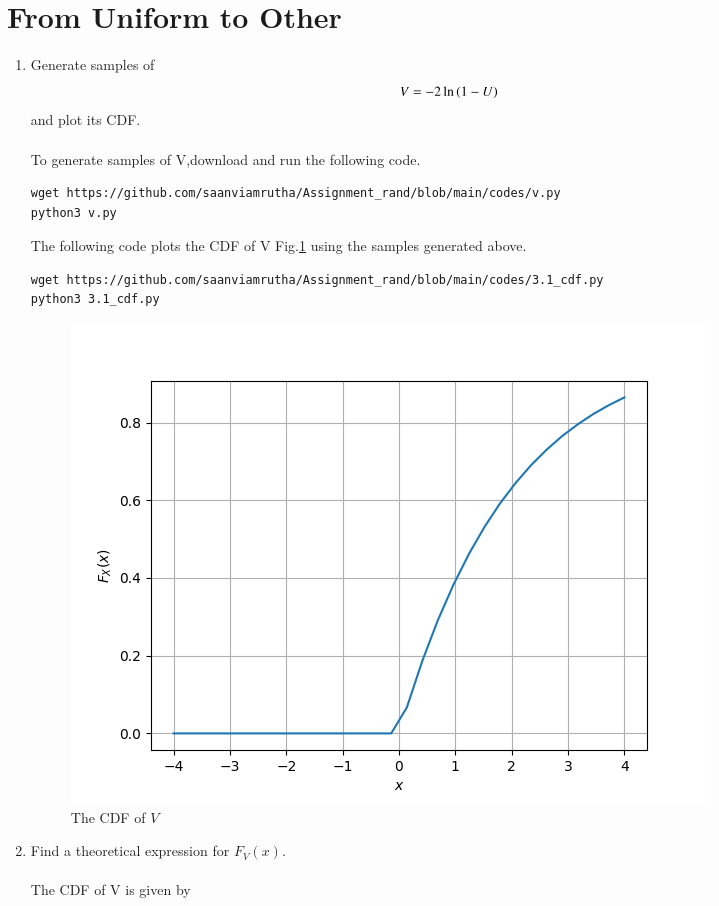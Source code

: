 \documentclass[journal,12pt,twocolumn]{IEEEtran}
\renewcommand\thesection{\arabic{section}}
\begin{document}
\section{From Uniform to Other}
\begin{enumerate}[label=\thesection.\arabic*
,ref=\thesection.\theenumi]
%
\item
Generate samples of 
%
\begin{equation}
V = -2\ln\left(1-U\right)
\end{equation}
%
and plot its CDF. \\
\solution \\
To generate samples of V,download and run the following code.
\begin{lstlisting}
wget https://github.com/saanviamrutha/Assignment_rand/blob/main/codes/v.py
python3 v.py
\end{lstlisting}
The following code plots the CDF of V Fig.\ref{fig:v_cdf} using the samples generated above.
\begin{lstlisting}
wget https://github.com/saanviamrutha/Assignment_rand/blob/main/codes/3.1_cdf.py
python3 3.1_cdf.py
\end{lstlisting}
\begin{figure}
\centering
\includegraphics[width=\columnwidth]{figures/v_cdf.png}
\caption{The CDF of $V$}
\label{fig:v_cdf}
\end{figure}
\item Find a theoretical expression for $F_V(x)$.
%
\\ \solution \\
The CDF of V is given by
\begin{align}

\end{align}
\end{enumerate}
\end{document}

